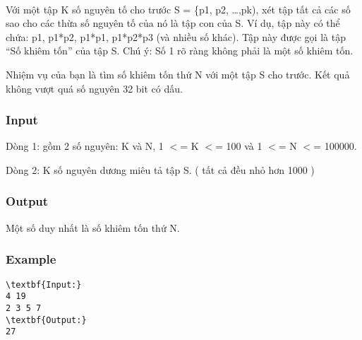 

 

Với một tập K số nguyên tố cho trước S = \{p1, p2, …,pk), xét tập tất cả các số sao cho các thừa số nguyên tố của nó là tập con của S. Ví dụ, tập này có thể chứa: p1, p1*p2, p1*p1, p1*p2*p3 (và nhiều số khác). Tập này được gọi là tập “Số khiêm tốn” của tập S. Chú ý: Số 1 rõ ràng không phải là một số khiêm tốn.

Nhiệm vụ của bạn là tìm số khiêm tốn thứ N với một tập S cho trước. Kết quả không vượt quá số nguyên 32 bit có dấu.

\subsubsection{Input}

Dòng 1: gồm 2 số nguyên: K và N, 1 $<$= K $<$= 100 và 1 $<$= N $<$= 100000.

Dòng 2: K số nguyên dương miêu tả tập S. ( tất cả đều nhỏ hơn 1000 )

\subsubsection{Output}

Một số duy nhất là số khiêm tốn thứ N.

\subsubsection{Example}
\begin{verbatim}
\textbf{Input:}
4 19
2 3 5 7
\textbf{Output:}
27\end{verbatim}